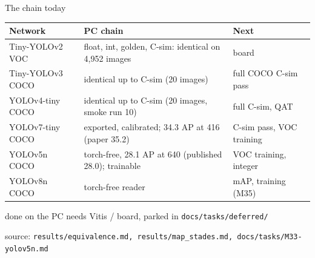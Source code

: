 \documentclass[aspectratio=169,11pt]{beamer}
\newcommand\src[1]{\par\vfill{\tiny\color{gray}source: \texttt{#1}}}
\begin{document}
\begin{frame}{The chain today}
  \centering

  \medskip
  \scriptsize
  \begin{tabularx}{\linewidth}{@{}l>{\raggedright\arraybackslash}Xl@{}}
    \toprule
    Network & PC chain & Next \\
    \midrule
    Tiny-YOLOv2 VOC & float, int, golden, C-sim: identical on 4,952 images & board \\
    Tiny-YOLOv3 COCO & identical up to C-sim (20 images) & full COCO C-sim pass \\
    YOLOv4-tiny COCO & identical up to C-sim (20 images, smoke run 10) & full C-sim, QAT \\
    YOLOv7-tiny COCO & exported, calibrated; 34.3 AP at 416 (paper 35.2) & C-sim pass, VOC training \\
    YOLOv5n COCO & torch-free, 28.1 AP at 640 (published 28.0); trainable & VOC training, integer \\
    YOLOv8n COCO & torch-free reader & mAP, training (M35) \\
    \bottomrule
  \end{tabularx}

  \medskip
  \colorbox{mLightGreen!25}{done on the PC}\quad
  \colorbox{black!8}{needs Vitis / board, parked in \texttt{docs/tasks/deferred/}}
  \src{results/equivalence.md, results/map\_stades.md, docs/tasks/M33-yolov5n.md}
\end{frame}
\end{document}
